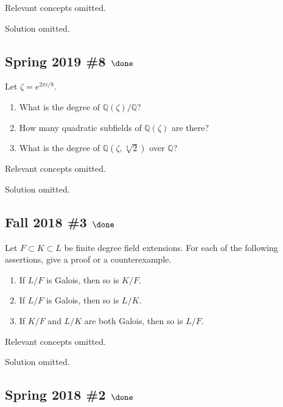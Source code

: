 Relevant concepts omitted.

Solution omitted.

\hypertarget{spring-2019-8-done}{%
\subsection{\texorpdfstring{Spring 2019 \#8
\(\done\)}{Spring 2019 \#8 \textbackslash done}}\label{spring-2019-8-done}}

Let \(\zeta = e^{2\pi i/8}\).

\begin{enumerate}
\def\labelenumi{\alph{enumi}.}
\item
  What is the degree of \({\mathbb{Q}}(\zeta)/{\mathbb{Q}}\)?
\item
  How many quadratic subfields of \({\mathbb{Q}}(\zeta)\) are there?
\item
  What is the degree of \({\mathbb{Q}}(\zeta, \sqrt[4] 2)\) over
  \({\mathbb{Q}}\)?
\end{enumerate}

Relevant concepts omitted.

Solution omitted.

\hypertarget{fall-2018-3-done}{%
\subsection{\texorpdfstring{Fall 2018 \#3
\(\done\)}{Fall 2018 \#3 \textbackslash done}}\label{fall-2018-3-done}}

Let \(F \subset K \subset L\) be finite degree field extensions. For
each of the following assertions, give a proof or a counterexample.

\begin{enumerate}
\def\labelenumi{\alph{enumi}.}
\item
  If \(L/F\) is Galois, then so is \(K/F\).
\item
  If \(L/F\) is Galois, then so is \(L/K\).
\item
  If \(K/F\) and \(L/K\) are both Galois, then so is \(L/F\).
\end{enumerate}

Relevant concepts omitted.

Solution omitted.

\hypertarget{spring-2018-2-done}{%
\subsection{\texorpdfstring{Spring 2018 \#2
\(\done\)}{Spring 2018 \#2 \textbackslash done}}\label{spring-2018-2-done}}

